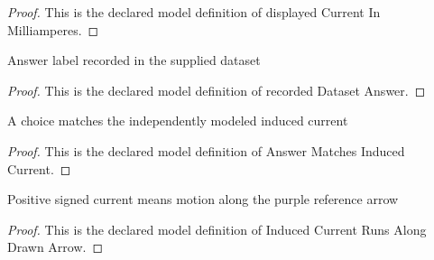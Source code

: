 \begin{proof}
  This is the declared model definition of displayed Current In Milliamperes.
\end{proof}
\begin{definition}
  \label{def:physics:phyx-mini-0917:phyxminiproblems-problemphyxmini0917-recordeddatasetanswer}
  Answer label recorded in the supplied dataset
\end{definition}
\begin{proof}
  This is the declared model definition of recorded Dataset Answer.
\end{proof}
\begin{definition}
  \label{def:physics:phyx-mini-0917:phyxminiproblems-problemphyxmini0917-answermatchesinducedcurrent}
  A choice matches the independently modeled induced current
\end{definition}
\begin{proof}
  This is the declared model definition of Answer Matches Induced Current.
\end{proof}
\begin{definition}
  \label{def:physics:phyx-mini-0917:phyxminiproblems-problemphyxmini0917-inducedcurrentrunsalongdrawnarrow}
  Positive signed current means motion along the purple reference arrow
\end{definition}
\begin{proof}
  This is the declared model definition of Induced Current Runs Along Drawn Arrow.
\end{proof}
